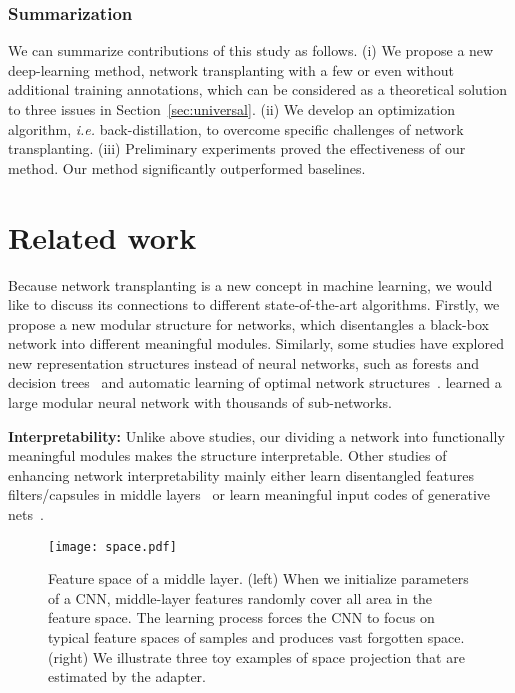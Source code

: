 \documentclass[10pt,twocolumn,letterpaper]{article}
\begin{document}
\subsubsection{Summarization}

We can summarize contributions of this study as follows. (i) We propose a new deep-learning method, network transplanting with a few or even without additional training annotations, which can be considered as a theoretical solution to three issues in Section~\ref{sec:universal}. (ii) We develop an optimization algorithm, \emph{i.e.} back-distillation, to overcome specific challenges of network transplanting. (iii) Preliminary experiments proved the effectiveness of our method. Our method significantly outperformed baselines.


\section{Related work}
\label{sec:related}

Because network transplanting is a new concept in machine learning, we would like to discuss its connections to different state-of-the-art algorithms. Firstly, we propose a new modular structure for networks, which disentangles a black-box network into different meaningful modules. Similarly, some studies have explored new representation structures instead of neural networks, such as forests and decision trees~\cite{deepForest1,deepForest2,distillDecisionTree,RNNTree} and automatic learning of optimal network structures~\cite{LearnNetStruct1,LearnNetStruct2,LearnNetStruct3,LearnNetStruct4}. \cite{NetMixOfExperts} learned a large modular neural network with thousands of sub-networks.

\textbf{Interpretability:} Unlike above studies, our dividing a network into functionally meaningful modules makes the structure interpretable. Other studies of enhancing network interpretability mainly either learn disentangled features filters/capsules in middle layers~\cite{interpretableCNN,InterRCNN,capsule} or learn meaningful input codes of generative nets~\cite{infoGAN,betaVAE}.

\begin{figure*}[t]
\centering
\texttt{[image: space.pdf]}
\vspace{2pt}
\caption{Feature space of a middle layer. (left) When we initialize parameters of a CNN, middle-layer features randomly cover all area in the feature space. The learning process forces the CNN to focus on typical feature spaces of samples and produces vast forgotten space. (right) We illustrate three toy examples of space projection that are estimated by the adapter.}
\label{fig:space}
\end{figure*}
\end{document}
